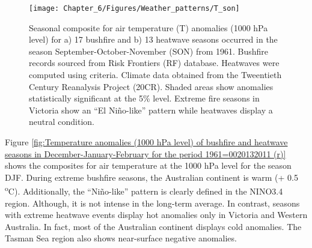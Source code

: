 \begin{figure}[h]
\noindent \begin{centering}
\texttt{[image: Chapter\_6/Figures/Weather\_patterns/T\_son]}
\par\end{centering}

\caption[Seasonal composite for air temperature (T) anomalies (1000 hPa level)
for a) 17 bushfire and b) 13 heatwave seasons occurred in the season
September-October-November (SON) from 1961]{Seasonal composite for air temperature (T) anomalies (1000 hPa level)
for a) 17 bushfire and b) 13 heatwave seasons occurred in the season
September-October-November (SON) from 1961. Bushfire
records sourced from Risk Frontiers (RF) database. Heatwaves were
computed using \citet{Pezza2012} criteria. Climate data obtained
from the Tweentieth Century Reanalysis Project (20CR). Shaded areas
show anomalies statistically significant at the 5\% level. Extreme
fire seasons in Victoria show an ``El Ni\~no-like'' pattern while
heatwaves display a neutral condition.\label{fig:Temperature anomalies (1000 hPa level) of bushfire and heatwave seasons in September-October-November for the period 1961=0020132011 (r)}}
\end{figure}


Figure \ref{fig:Temperature anomalies (1000 hPa level) of bushfire and heatwave seasons in December-January-February for the period 1961=0020132011 (r)}
shows the composites for air temperature at the 1000 hPa level for
the season DJF. During extreme bushfire seasons, the Australian continent
is warm (+ 0.5 \textsuperscript{o}C). Additionally, the ``Ni\~no-like''
pattern is clearly defined in the NINO3.4 region. Although, it is
not intense in the long-term average. In contrast, seasons with extreme
heatwave events display hot anomalies only in Victoria and Western
Australia. In fact, most of the Australian continent displays cold
anomalies. The Tasman Sea region also shows near-surface negative
anomalies. 

